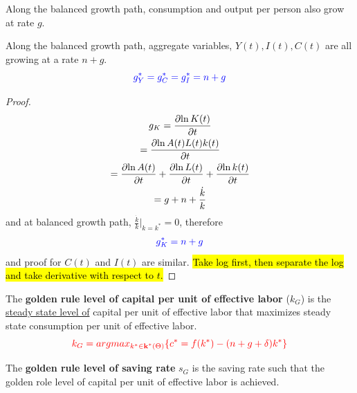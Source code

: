 \documentclass[11pt]{article}
\begin{document}
			\begin{proposition}
				Along the balanced growth path, consumption and output per person also grow at rate $g$.
			\end{proposition}
			
			\begin{proposition}
				Along the balanced growth path, aggregate variables, $Y(t), I(t), C(t)$ are all growing at a rate $n + g$.
				\begin{equation}
					\textcolor{blue}{
						g_{Y}^* = g_{C}^* = g_{I}^* = n + g
						}
				\end{equation}
			\end{proposition}
			\begin{proof}
				\begin{gather*}
				g_{K} = \frac{\partial{\ln{K(t)}}}{\partial{t}} \\
				= \frac{\partial{\ln{A(t)L(t)k(t)}}}{\partial{t}} \\
				= \frac{\partial{\ln{A(t)}}}{\partial{t}} + \frac{\partial{\ln{L(t)}}}{\partial{t}} + \frac{\partial{\ln{k(t)}}}{\partial{t}} \\
				= g + n + \frac{\dot{k}}{k}
				\end{gather*}
				and at balanced growth path, $\frac{\dot{k}}{k}|_{k=k^*} = 0$, therefore 
				\begin{equation}
					\textcolor{blue}{
						g_K^* = n + g
					}
				\end{equation}
				and proof for $C(t)$ and $I(t)$ are similar. \hl{Take log first, then separate the log and take derivative with respect to $t$.}
			\end{proof}
		
		\begin{definition}
			The \textbf{golden rule level of capital per unit of effective labor} ($k_G$) is the \ul{steady state level of} capital per unit of effective labor that maximizes steady state consumption per unit of effective labor.
				\begin{equation}
				\textcolor{red}{
					k_G = argmax_{k^* \in \textbf{k}^*(\Theta)} \{c^* = f(k^*) - (n+g+ \delta) k^*\}
					}
				\end{equation}
		\end{definition}
		
		\begin{definition}
			The \textbf{golden rule level of saving rate} $s_G$ is the saving rate such that the golden role level of capital per unit of effective labor is achieved.
		\end{definition}
		
\end{document}
